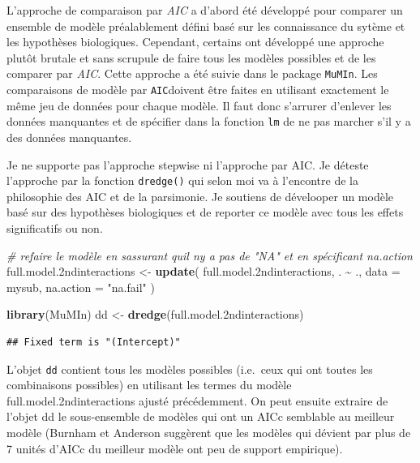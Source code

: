 \documentclass[
  12pt,
]{book}
\makeatletter
\newenvironment{Shaded}{\begin{snugshade}}{\end{snugshade}}
\newcommand{\CommentTok}[1]{\textcolor[rgb]{0.56,0.35,0.01}{\textit{#1}}}
\newcommand{\DataTypeTok}[1]{\textcolor[rgb]{0.13,0.29,0.53}{#1}}
\newcommand{\FloatTok}[1]{\textcolor[rgb]{0.00,0.00,0.81}{#1}}
\newcommand{\KeywordTok}[1]{\textcolor[rgb]{0.13,0.29,0.53}{\textbf{#1}}}
\newcommand{\NormalTok}[1]{#1}
\newcommand{\OperatorTok}[1]{\textcolor[rgb]{0.81,0.36,0.00}{\textbf{#1}}}
\newcommand{\StringTok}[1]{\textcolor[rgb]{0.31,0.60,0.02}{#1}}
\newenvironment{kframe}{%
\medskip{}
\setlength{\fboxsep}{.8em}
\def\at@end@of@kframe{}%
\ifinner\ifhmode%
 \def\at@end@of@kframe{\end{minipage}}%
 \begin{minipage}{\columnwidth}%
\fi\fi%
\def\FrameCommand##1{\hskip\@totalleftmargin \hskip-\fboxsep
\colorbox{incolor}{##1}\hskip-\fboxsep
    \hskip-\linewidth \hskip-\@totalleftmargin \hskip\columnwidth}%
\MakeFramed {\advance\hsize-\width
  \@totalleftmargin\z@ \linewidth\hsize
  \@setminipage}}%
{\par\unskip\endMakeFramed%
\at@end@of@kframe}
\newenvironment{rmdblock}[1]
 {
 \begin{itemize}
 \renewcommand{\labelitemi}{
   \raisebox{-.7\height}[0pt][0pt]{
     {\setkeys{Gin}{width=3em,keepaspectratio}\texttt{[image: images/\#1]}}
   }
 }
 \begin{kframe}
 \setlength{\fboxsep}{1em}
 \item
 }
 {
 \end{kframe}
 \end{itemize}
 }
\newenvironment{rmdnote}
  {\begin{rmdblock}{note}}
  {\end{rmdblock}}
\makeatother
\begin{document}
L'approche de comparaison par \emph{AIC} a d'abord été développé pour comparer un ensemble de modèle préalablement défini basé sur les connaissance du sytème et les hypothèses biologiques. Cependant, certains ont développé une approche plutôt brutale et sans scrupule de faire tous les modèles possibles et de les comparer par \emph{AIC}. Cette approche a été suivie dans le package \texttt{MuMIn}. Les comparaisons de modèle par \texttt{AIC}doivent être faites en utilisant exactement le même jeu de données pour chaque modèle.
Il faut donc s'arrurer d'enlever les données manquantes et de spécifier dans la fonction \texttt{lm} de ne pas marcher s'il y a des données manquantes.

\begin{rmdnote}
Je ne supporte pas l'approche stepwise ni l'approche par AIC. Je déteste l'approche par la fonction \texttt{dredge()} qui selon moi va à l'encontre de la philosophie des AIC et de la parsimonie. Je soutiens de dévelooper un modèle basé sur des hypothèses biologiques et de reporter ce modèle avec tous les effets significatifs ou non.
\end{rmdnote}

\begin{Shaded}
\begin{Highlighting}[]
\CommentTok{\# refaire le modèle en s\textquotesingle{}assurant qu\textquotesingle{}il n\textquotesingle{}y a pas de "NA" et en spécificant na.action}
\NormalTok{full.model}\FloatTok{.2}\NormalTok{ndinteractions \textless{}{-}}\StringTok{ }\KeywordTok{update}\NormalTok{(}
\NormalTok{  full.model}\FloatTok{.2}\NormalTok{ndinteractions,}
\NormalTok{  . }\OperatorTok{\textasciitilde{}}\StringTok{ }\NormalTok{.,}
  \DataTypeTok{data =}\NormalTok{ mysub,}
  \DataTypeTok{na.action =} \StringTok{"na.fail"}
\NormalTok{)}

\KeywordTok{library}\NormalTok{(MuMIn)}
\NormalTok{dd \textless{}{-}}\StringTok{ }\KeywordTok{dredge}\NormalTok{(full.model}\FloatTok{.2}\NormalTok{ndinteractions)}
\end{Highlighting}
\end{Shaded}

\begin{verbatim}
## Fixed term is "(Intercept)"
\end{verbatim}

L'objet \texttt{dd} contient tous les modèles possibles (i.e.~ceux qui ont toutes les combinaisons possibles) en utilisant les termes du modèle full.model.2ndinteractions ajusté précédemment. On peut ensuite extraire de l'objet dd le sous-ensemble de modèles qui ont un AICc semblable au meilleur modèle (Burnham et Anderson suggèrent que les modèles qui dévient par plus de 7 unités d'AICc du meilleur modèle ont peu de support empirique).
\end{document}
